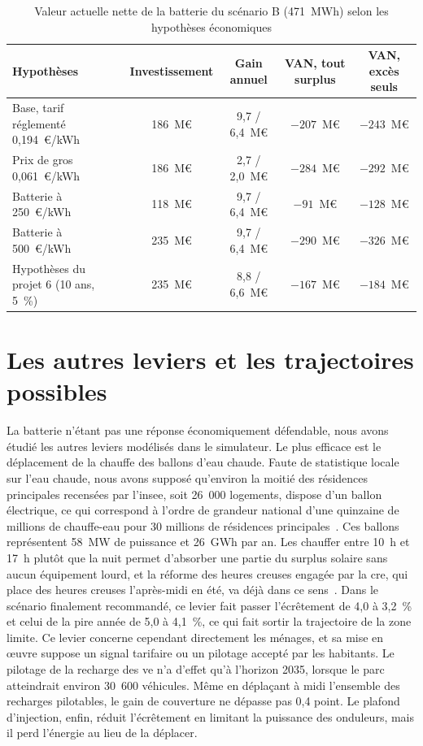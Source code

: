 \begin{table}[H]
\centering
\footnotesize
\caption{Valeur actuelle nette de la batterie du scénario B (471~MWh) selon les hypothèses économiques}
\label{tab:eco}
{\renewcommand{\arraystretch}{1.2}
\begin{tabularx}{\textwidth}{@{}>{\raggedright\arraybackslash}X cccc@{}}
\toprule
\textbf{Hypothèses} & \textbf{Investissement} & \textbf{Gain annuel} & \textbf{VAN, tout surplus} & \textbf{VAN, excès seuls} \\
\midrule
Base, tarif réglementé 0,194~€/kWh & 186~M€ & 9,7 / 6,4~M€ & $-207$~M€ & $-243$~M€ \\
Prix de gros 0,061~€/kWh & 186~M€ & 2,7 / 2,0~M€ & $-284$~M€ & $-292$~M€ \\
Batterie à 250~€/kWh & 118~M€ & 9,7 / 6,4~M€ & $-91$~M€ & $-128$~M€ \\
Batterie à 500~€/kWh & 235~M€ & 9,7 / 6,4~M€ & $-290$~M€ & $-326$~M€ \\
Hypothèses du projet 6 (10 ans, 5~\%) & 235~M€ & 8,8 / 6,6~M€ & $-167$~M€ & $-184$~M€ \\
\bottomrule
\end{tabularx}}
\end{table}

\section{Les autres leviers et les trajectoires possibles}
\label{sec:leviers}

La batterie n'étant pas une réponse économiquement défendable, nous avons étudié les autres leviers modélisés dans le simulateur. Le plus efficace est le déplacement de la chauffe des ballons d'eau chaude. Faute de statistique locale sur l'eau chaude, nous avons supposé qu'environ la moitié des résidences principales recensées par l'\gls{insee}, soit 26~000 logements, dispose d'un ballon électrique, ce qui correspond à l'ordre de grandeur national d'une quinzaine de millions de chauffe-eau pour 30 millions de résidences principales~\cite{construction21}. Ces ballons représentent 58~MW de puissance et 26~GWh par an. Les chauffer entre 10~h et 17~h plutôt que la nuit permet d'absorber une partie du surplus solaire sans aucun équipement lourd, et la réforme des heures creuses engagée par la \gls{cre}, qui place des heures creuses l'après-midi en été, va déjà dans ce sens~\cite{cre_hphc}. Dans le scénario finalement recommandé, ce levier fait passer l'écrêtement de 4,0 à 3,2~\% et celui de la pire année de 5,0 à 4,1~\%, ce qui fait sortir la trajectoire de la zone limite. Ce levier concerne cependant directement les ménages, et sa mise en œuvre suppose un signal tarifaire ou un pilotage accepté par les habitants. Le pilotage de la recharge des \gls{ve} n'a d'effet qu'à l'horizon 2035, lorsque le parc atteindrait environ 30~600 véhicules. Même en déplaçant à midi l'ensemble des recharges pilotables, le gain de couverture ne dépasse pas 0,4 point. Le plafond d'injection, enfin, réduit l'écrêtement en limitant la puissance des onduleurs, mais il perd l'énergie au lieu de la déplacer.

